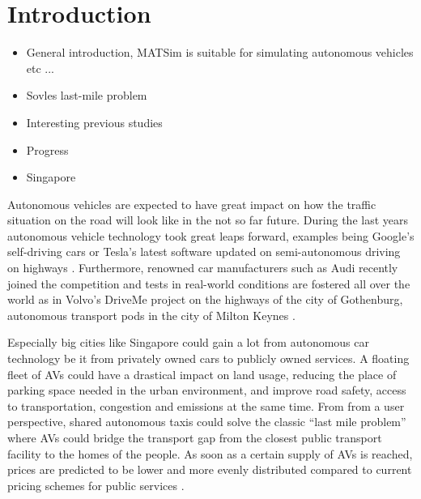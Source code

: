 \section{Introduction}

\begin{itemize}

\item General introduction, MATSim is suitable for simulating autonomous vehicles \citep{Boesch2015} etc ...

\item Sovles last-mile problem \citep{Litman2014}

\item Interesting previous studies \citep{Fagnant2014, ITF2014}

\item Progress \citep{Silberg2013, SchoettleBrandon2014}

\item Singapore \citep{Kheong2014}

\end{itemize}


Autonomous vehicles are expected to have great impact on how the traffic situation
on the road will look like in the not so far future. During the last years autonomous
vehicle technology took great leaps forward, examples being Google's self-driving cars
 or Tesla's latest software updated on semi-autonomous driving on highways .
Furthermore, renowned car manufacturers such as Audi recently joined the competition
and tests in real-world conditions are fostered all over the world as in Volvo's
DriveMe project on the highways of the city of Gothenburg, autonomous transport pods
in the city of Milton Keynes .

Especially big cities like Singapore could gain a lot from autonomous car technology
be it from privately owned cars to publicly owned services. A floating fleet of
AVs could have a drastical impact on land usage, reducing the place of parking
space needed in the urban environment, and improve road safety, access to transportation,
congestion and emissions at the same time. 
From from a user perspective, shared autonomous taxis could solve the classic ``last mile problem'' where AVs could
bridge the transport gap from the closest public transport facility to the homes
of the people. As soon as a certain supply of AVs is reached, prices are predicted
to be lower and more evenly distributed compared to current pricing schemes for
public services .

